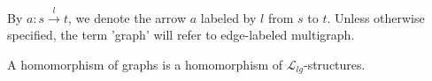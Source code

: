 By $a : s\overset{l}{\rightarrow} t$, we denote the arrow $a$ labeled by $l$ from $s$ to $t$. Unless otherwise specified, the term 'graph' will refer to edge-labeled multigraph.
\begin{definition}
    \label{def:homomorphism_lg}
    A homomorphism of graphs is a homomorphism of $\mathcal{L}_{lg}$-structures.
\end{definition}
% 
% 
% 
